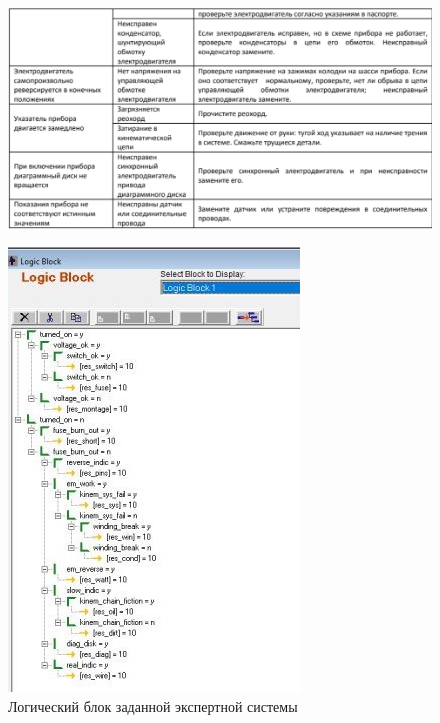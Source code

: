 \documentclass[14pt,a4paper,report]{report}
\begin{document}
\begin{figure}[h!]
	\centering
	\includegraphics[scale = 0.65]{images/7_x2.png}
\end{figure}

\clearpage

\begin{figure}[h!]
	\centering
	\includegraphics[scale = 1.35]{images/1.jpg}
	\caption{Логический блок заданной экспертной системы}
\end{figure}

\clearpage
\end{document}
